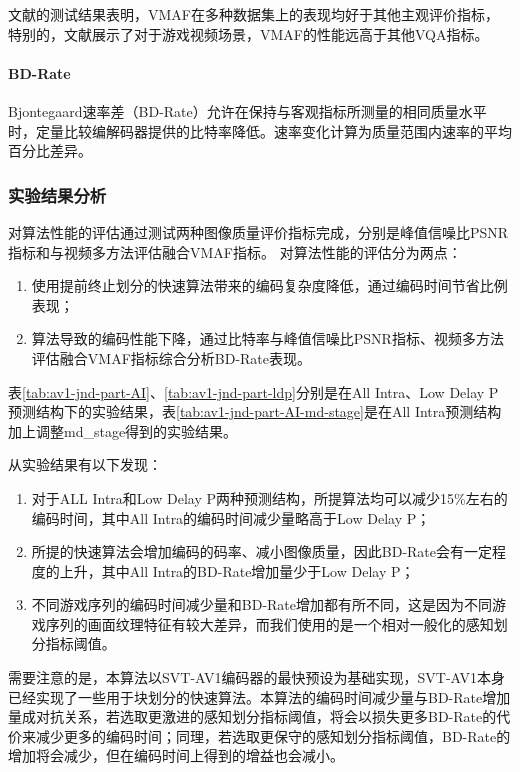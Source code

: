 	文献\cite{liPracticalPerceptualVideo,barmanEvaluationVideoQuality2018a, leeComparisonObjectiveQuality2017}的测试结果表明，VMAF在多种数据集上的表现均好于其他主观评价指标，特别的，文献\cite{barmanEvaluationVideoQuality2018a}展示了对于游戏视频场景，VMAF的性能远高于其他VQA指标。

	\paragraph{BD-Rate} Bjontegaard速率差（BD-Rate）允许在保持与客观指标所测量的相同质量水平时，定量比较编解码器提供的比特率降低。速率变化计算为质量范围内速率的平均百分比差异。

  \subsubsection{实验结果分析}

  对算法性能的评估通过测试两种图像质量评价指标完成，分别是峰值信噪比PSNR指标和与视频多方法评估融合VMAF指标。
  对算法性能的评估分为两点：

  \begin{enumerate}[label=\arabic*)]
    \item 使用提前终止划分的快速算法带来的编码复杂度降低，通过编码时间节省比例表现；
    \item 算法导致的编码性能下降，通过比特率与峰值信噪比PSNR指标、视频多方法评估融合VMAF指标综合分析BD-Rate表现。
  \end{enumerate}

  表\ref{tab:av1-jnd-part-AI}、\ref{tab:av1-jnd-part-ldp}分别是在All Intra、Low Delay P预测结构下的实验结果，表\ref{tab:av1-jnd-part-AI-md-stage}是在All Intra预测结构加上调整md\_stage得到的实验结果。

  从实验结果有以下发现：

  \begin{enumerate}[label=\arabic*)]
    \item 对于ALL Intra和Low Delay P两种预测结构，所提算法均可以减少15\%左右的编码时间，其中All Intra的编码时间减少量略高于Low Delay P；
    \item 所提的快速算法会增加编码的码率、减小图像质量，因此BD-Rate会有一定程度的上升，其中All Intra的BD-Rate增加量少于Low Delay P；
    \item 不同游戏序列的编码时间减少量和BD-Rate增加都有所不同，这是因为不同游戏序列的画面纹理特征有较大差异，而我们使用的是一个相对一般化的感知划分指标阈值。
  \end{enumerate}

  需要注意的是，本算法以SVT-AV1编码器的最快预设为基础实现，SVT-AV1本身已经实现了一些用于块划分的快速算法。本算法的编码时间减少量与BD-Rate增加量成对抗关系，若选取更激进的感知划分指标阈值，将会以损失更多BD-Rate的代价来减少更多的编码时间；同理，若选取更保守的感知划分指标阈值，BD-Rate的增加将会减少，但在编码时间上得到的增益也会减小。


